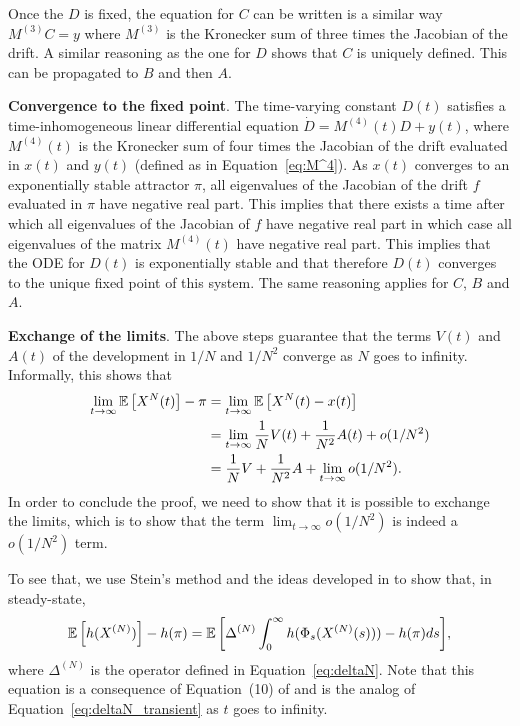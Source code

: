 \documentclass[sigconf]{acmart}
\newcommand\XN{X^{(N)}}
\newcommand\DeltaN{\Delta^{(N)}}
\newcommand\esp[1]{{\mathchoice{\besp{#1}}{\sesp{#1}}{\sesp{#1}}{\sesp{#1}}}}
\newcommand\besp[1]{\mathbb{E}\left[#1\right]}
\newcommand\sesp[1]{\mathbb{E}[#1]}
\begin{document}
Once the $D$ is fixed, the equation for $C$ can be written is a
similar way $M^{(3)}C=y$ where $M^{(3)}$ is the Kronecker sum of three
times the Jacobian of the drift. A similar reasoning as the one for
$D$ shows that $C$ is uniquely defined. This can be propagated to $B$
and then $A$.

\textbf{Convergence to the fixed point}.  The time-varying constant
$D(t)$ satisfies a time-inhomogeneous linear differential equation
$\dot{D} = M^{(4)}(t)D + y(t)$, where $M^{(4)}(t)$ is the Kronecker
sum of four times the Jacobian of the drift evaluated in $x(t)$ and
$y(t)$ (defined as in Equation~\eqref{eq:M^4}). As $x(t)$ converges to
an exponentially stable attractor $\pi$, all eigenvalues of the
Jacobian of the drift $f$ evaluated in $\pi$ have negative real
part. This implies that there exists a time after which all
eigenvalues of the Jacobian of $f$ have negative real part in which
case all eigenvalues of the matrix $M^{(4)}(t)$ have negative real
part. This implies that the ODE for $D(t)$ is exponentially stable and
that therefore $D(t)$ converges to the unique fixed point of this
system. The same reasoning applies for $C$, $B$ and $A$.

\textbf{Exchange of the limits}. The above steps guarantee that the
terms $V(t)$ and $A(t)$ of the development in $1/N$ and $1/N^2$
converge as $N$ goes to infinity. Informally, this shows that
\begin{align}
  \lim_{t\to\infty}\esp{X^N(t)}-\pi
  &=\lim_{t\to\infty}\esp{X^N(t)-x(t)} \nonumber\\%
  &= \lim_{t\to\infty} \frac1NV(t) + \frac1{N^2} A(t) + o(1/N^2)\nonumber\\
  &=  \frac1NV + \frac1{N^2} A + \lim_{t\to\infty}o(1/N^2)\label{eq:proof_VA}. 
\end{align}
In order to conclude the proof, we need to show that it is possible to
exchange the limits, which is to show that the term
$\lim_{t\to\infty}o(1/N^2)$ is indeed a $o(1/N^2)$ term.

To see that, we use Stein's method and the ideas developed in
\cite{ying2016rate,gast2017expected} to show that, in steady-state, 
\begin{align*}
  \esp{h(\XN)} - h(\pi) = \esp{ \DeltaN \int_0^\infty
  h(\Phi_s(\XN(s)))-h(\pi)ds},
\end{align*}
where $\DeltaN$ is the operator defined in
Equation~\eqref{eq:deltaN}. Note that this equation is a consequence
of Equation~(10) of \cite{gast2017expected} and is the analog of
Equation~\eqref{eq:deltaN_transient} as $t$ goes to infinity.
\end{document}
